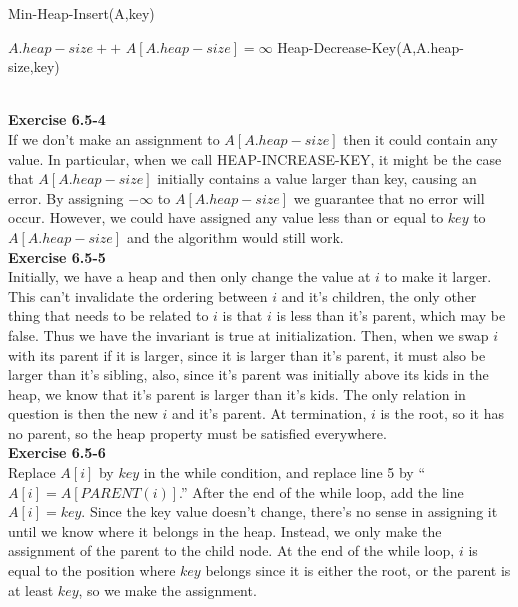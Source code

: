 \documentclass{article}
\begin{document}
Min-Heap-Insert(A,key)
\begin{algorithm}
\begin{algorithmic}[1]
\State $A.heap-size ++$
\State $A[A.heap-size] = \infty$
\State Heap-Decrease-Key(A,A.heap-size,key)
\end{algorithmic}
\end{algorithm}\\

\noindent\textbf{Exercise 6.5-4}\\

If we don't make an assignment to $A[A.heap-size]$ then it could contain any value. In particular, when we call HEAP-INCREASE-KEY, it might be the case that $A[A.heap-size]$ initially contains a value larger than key, causing an error.  By assigning $-\infty$ to $A[A.heap-size]$ we guarantee that no error will occur.  However, we could have assigned any value less than or equal to $key$ to $A[A.heap-size]$ and the algorithm would still work. \\

\noindent\textbf{Exercise 6.5-5}\\

Initially, we have a heap and then only change the value at $i$ to make it larger. This can't invalidate the ordering between $i$ and it's children, the only other thing that needs to be related to $i$ is that $i$ is less than it's parent, which may be false. Thus we have the invariant is true at initialization. Then, when we swap $i$ with its parent if it is larger, since it is larger than it's parent, it must also be larger than it's sibling, also, since it's parent was initially above its kids in the heap, we know that it's parent is larger than it's kids. The only relation in question is then the new $i$ and it's parent. At termination, $i$ is the root, so it has no parent, so the heap property must be satisfied everywhere.\\

\noindent\textbf{Exercise 6.5-6}\\

Replace $A[i]$ by $key$ in the while condition, and replace line 5 by ``$A[i] = A[PARENT(i)]$.''  After the end of the while loop, add the line $A[i] = key$.  Since the key value doesn't change, there's no sense in assigning it until we know where it belongs in the heap.  Instead, we only make the assignment of the parent to the child node.  At the end of the while loop, $i$ is equal to the position where $key$ belongs since it is either the root, or the parent is at least $key$, so we make the assignment. \\
\end{document}
